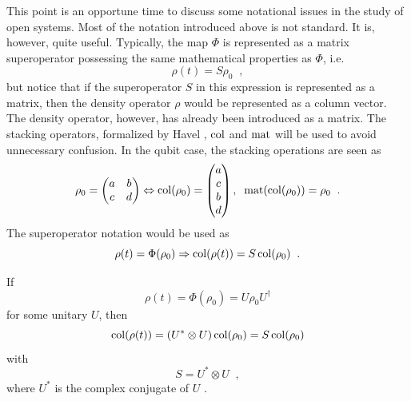 This point is an opportune time to discuss some notational issues in the study of open systems.  Most of the notation introduced above is not standard.  It is, however, quite useful.  Typically, the map $\Phi$ is represented as a matrix superoperator possessing the same mathematical properties as $\Phi$, i.e.\
$$
\rho(t) = S\rho_0\;\;,
$$
but notice that if the superoperator $S$ in this expression is represented as a matrix, then the density operator $\rho$ would be represented as a column vector.  The density operator, however, has already been introduced as a matrix.  The stacking operators, formalized by Havel \cite{Havel2003}, $\operatorname{col}$ and $\operatorname{mat}$ will be used to avoid unnecessary confusion.  In the qubit case, the stacking operations are seen as
$$
\rho_0 = \begin{pmatrix}
a & b\\
c & d
\end{pmatrix} \Leftrightarrow \operatorname{col}(\rho_0) = \begin{pmatrix}
a\\
c\\
b\\
d
\end{pmatrix},\;\;\operatorname{mat}(\operatorname{col}(\rho_0)) = \rho_0\;\;.
$$
The superoperator notation would be used as
$$
\rho(t) = \Phi(\rho_0) \Rightarrow \operatorname{col}(\rho(t)) = S \operatorname{col}(\rho_0)\;\;.
$$
\begin{example}
If
$$
\rho(t) = \Phi(\rho_0) = U\rho_0 U^\dagger
$$
for some unitary $U$, then
$$
\operatorname{col}(\rho(t)) = ( U^* \otimes U)\operatorname{col}(\rho_0) = S \operatorname{col}(\rho_0)
$$
with 
$$
S = U^* \otimes U\;\;,
$$
where $U^*$ is the complex conjugate of $U$ \cite{Havel2003}.
\end{example}

